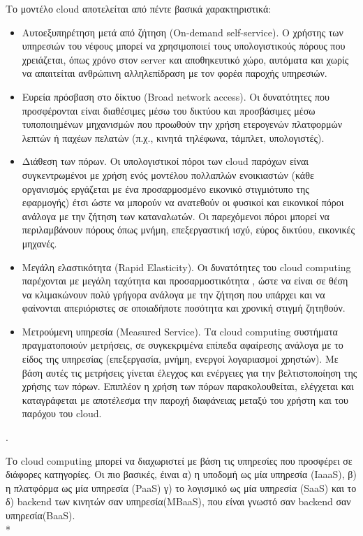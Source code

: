 		Το μοντέλο cloud αποτελείται από πέντε βασικά χαρακτηριστικά:
		\begin{itemize}
		\item Αυτοεξυπηρέτηση μετά από ζήτηση (On-demand self-service). Ο χρήστης των υπηρεσιών του νέφους μπορεί να χρησιμοποιεί τους υπολογιστικούς πόρους που χρειάζεται, όπως χρόνο στον server και αποθηκευτικό χώρο,  αυτόματα και χωρίς να απαιτείται ανθρώπινη αλληλεπίδραση με τον φορέα παροχής υπηρεσιών. 
		\item Ευρεία πρόσβαση στο δίκτυο (Broad network access). Οι δυνατότητες που προσφέρονται είναι διαθέσιμες μέσω του δικτύου και προσβάσιμες μέσω τυποποιημένων μηχανισμών που προωθούν την χρήση ετερογενών πλατφορμών λεπτών ή παχέων πελατών (π.χ., κινητά τηλέφωνα, τάμπλετ, υπολογιστές). 
		\item Διάθεση των πόρων. Οι υπολογιστικοί πόροι των cloud παρόχων είναι συγκεντρωμένοι με χρήση ενός μοντέλου πολλαπλών ενοικιαστών (κάθε οργανισμός εργάζεται με ένα προσαρμοσμένο εικονικό στιγμιότυπο της εφαρμογής) έτσι ώστε να  μπορούν να ανατεθούν οι φυσικοί και εικονικοί πόροι ανάλογα με την ζήτηση των καταναλωτών. Οι παρεχόμενοι πόροι μπορεί να περιλαμβάνουν πόρους όπως μνήμη, επεξεργαστική ισχύ, εύρος δικτύου, εικονικές μηχανές.
		\item Μεγάλη ελαστικότητα (Rapid Elasticity). Οι δυνατότητες του cloud computing παρέχονται με μεγάλη ταχύτητα και προσαρμοστικότητα , ώστε να είναι σε θέση να κλιμακώνουν πολύ γρήγορα ανάλογα με την ζήτηση που υπάρχει και να φαίνονται απεριόριστες σε οποιαδήποτε ποσότητα και χρονική στιγμή ζητηθούν. 
		\item Μετρούμενη υπηρεσία (Measured Service). Τα cloud computing συστήματα πραγματοποιούν μετρήσεις, σε συγκεκριμένα επίπεδα αφαίρεσης ανάλογα με το είδος της υπηρεσίας (επεξεργασία, μνήμη, ενεργοί λογαριασμοί χρηστών). Με βάση αυτές τις μετρήσεις γίνεται έλεγχος και ενέργειες για την βελτιστοποίηση της χρήσης των πόρων. Επιπλέον η χρήση των πόρων παρακολουθείται, ελέγχεται και καταγράφεται με αποτέλεσμα την παροχή διαφάνειας μεταξύ του χρήστη και του παρόχου του cloud.
		\end{itemize}	\cite{characteristicsCloud}\cite{nist}.

Το cloud computing μπορεί να διαχωριστεί με βάση τις υπηρεσίες που προσφέρει σε διάφορες κατηγορίες. Οι πιο βασικές, έιναι α) η υποδομή ως μία υπηρεσία (IaaaS), β) η πλατφόρμα ως μία υπηρεσία (PaaS) γ) το λογισμικό ως μία υπηρεσία (SaaS) και το δ) backend των κινητών σαν υπηρεσία(MBaaS), που είναι γνωστό σαν backend σαν υπηρεσία(BaaS).
\\*
